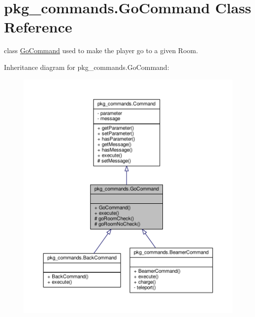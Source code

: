 \hypertarget{classpkg__commands_1_1GoCommand}{\section{pkg\-\_\-commands.\-Go\-Command Class Reference}
\label{classpkg__commands_1_1GoCommand}
}


class \hyperlink{classpkg__commands_1_1GoCommand}{Go\-Command} used to make the player go to a given Room.  




Inheritance diagram for pkg\-\_\-commands.\-Go\-Command\-:\nopagebreak
\begin{figure}[H]
\begin{center}
\leavevmode
\includegraphics[width=350pt]{classpkg__commands_1_1GoCommand__inherit__graph}
\end{center}
\end{figure}


